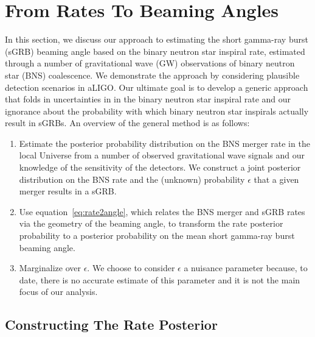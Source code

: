 \documentclass[twocolumn,nofootinbib]{revtex4-1}
\def\bns#1{binary neutron star#1 (BNS#1)\gdef\bns{BNS}}
\def\gw#1{gravitational wave#1 (GW#1)\gdef\gw{GW}}
\def\sgrb#1{short gamma-ray burst#1 (sGRB#1)\gdef\sgrb{sGRB}}
\begin{document}
\section{From Rates To Beaming Angles}

In this section, we discuss our approach to estimating the \sgrb{} beaming
angle based on the binary neutron star inspiral rate, estimated through a number
of \gw{} observations of \bns{} coalescence. We demonstrate the approach by
considering plausible detection scenarios in aLIGO.  Our ultimate goal is to
develop a generic approach that folds in uncertainties in in the binary neutron
star inspiral rate and our ignorance about the probability with which binary
neutron star inspirals actually result in \sgrb{s}.
%
An overview of the general method is as follows:

\begin{enumerate}
    \item Estimate the posterior probability distribution on the \bns{} merger rate
    in the local Universe from a number of observed gravitational wave signals
    and our knowledge of the sensitivity of the detectors.  We construct a joint
    posterior distribution on the \bns{} rate and the (unknown) probability
    $\epsilon$ that a given merger results in a \sgrb{}.
\item Use equation~\ref{eq:rate2angle}, which relates the \bns{} merger and
    \sgrb{} rates via the geometry of the beaming angle, to transform the rate
    posterior probability to a posterior probability on the mean short gamma-ray
    burst beaming angle.
\item Marginalize over $\epsilon$. We choose to consider $\epsilon$ a nuisance
    parameter because, to date, there is no accurate estimate of this parameter
    and it is not the main focus of our analysis. 
\end{enumerate}


\subsection{Constructing The Rate Posterior}
\label{sec:rate_posterior}
%
\end{document}
